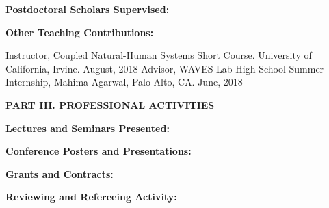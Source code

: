 \documentclass[10pt]{article}
\begin{document}
\vspace{0.5cm}
{\bf Postdoctoral Scholars Supervised:}


\vspace{0.5cm}
{\bf Other Teaching Contributions:}
\vspace{0.25cm}

Instructor, Coupled Natural-Human Systems Short Course. University of California, Irvine. August, 2018
Advisor, WAVES Lab High School Summer Internship, Mahima Agarwal, Palo Alto, CA. June, 2018
 
\newpage

\vspace{0.5cm}
\textbf{PART III.  PROFESSIONAL ACTIVITIES}

\vspace{0.5cm}
\textbf{Lectures and Seminars Presented:}
\vspace{0.25cm}
{\setlength{\extrarowheight}{3.5pt}

}


\vspace{0.5cm}
\textbf{Conference Posters and Presentations:}
\vspace{0.25cm}
{\setlength{\extrarowheight}{3.5pt}

}

\vspace{0.5cm}
\textbf{Grants and Contracts:}
\vspace{0.25cm}
{\setlength{\extrarowheight}{3.5pt}

}

\vspace{0.5cm}
\textbf{Reviewing and Refereeing Activity:}
\vspace{0.2cm}

\end{document}
